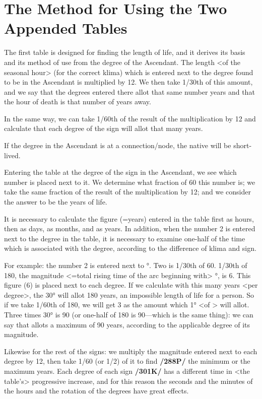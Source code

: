 \section{The Method for Using the Two Appended Tables}

The first table is designed for finding the length of life, and it derives its basis and its method of use from the degree of the Ascendant. The length <of the seasonal hour> (for the correct klima) which is
entered next to the degree found to be in the Ascendant is multiplied by 12. We then take 1/30th of this amount, and we say that the degrees entered there allot that same number years and that the hour of death is that number of years away. 

In the same way, we can take 1/60th of the result of the multiplication by 12 and calculate that each degree of the sign will allot that many years. 

If the degree in the Ascendant is at a connection/node, the native will be short-lived.

Entering the table at the degree of the sign in the Ascendant, we see which number is placed next to it. We determine what fraction of 60 this number is; we take the same fraction of the result of the multiplication by 12; and we consider the answer to be the years of life. 

It is necessary to calculate the figure (=years) entered in the table first as hours, then as days, as months, and as years. In addition, when
the number 2 is entered next to the degree in the table, it is necessary to examine one-half of the time which is associated with the degree, according to the difference of klima and sign.

For example: the number 2 is entered next to \Libra\xspace 1°. Two is 1/30th of 60. 1/30th of 180, the magnitude <=total rising time of the arc beginning with> \Libra\xspace 1°, is 6. This figure (6) is placed next to each degree. If we calculate with this many years <per degree>, the 30° will allot 180 years, an impossible length of life for a person. So if we take 1/60th of 180, we will get 3 as the amount which 1° <of \Libra> will allot. Three times 30° is 90 (or one-half of 180 is 90—which is the same thing): we can say that \Libra\xspace allots a maximum of 90 years, according to the applicable degree of its magnitude.

Likewise for the rest of the signs: we multiply the magnitude entered next to each degree by 12, then take 1/60 (or 1/2) of it to find \textbf{/288P/} the minimum or the maximum years. Each degree of each sign
\textbf{/301K/} has a different time in <the table’s> progressive increase, and for this reason the seconds and the minutes of the hours and the rotation of the degrees have great effects.

